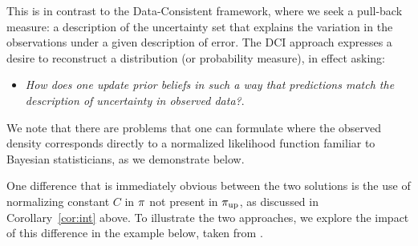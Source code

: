 This is in contrast to the Data-Consistent framework, where we seek a pull-back measure: a description of the uncertainty set that explains the variation in the observations under a given description of error.
The DCI approach expresses a desire to reconstruct a distribution (or probability measure), in effect asking:
\begin{itemize} 
  \item \emph{How does one update prior beliefs in such a way that predictions match the description of uncertainty in observed data?}.
\end{itemize}

We note that there are problems that one can formulate where the observed density corresponds directly to a normalized likelihood function familiar to Bayesian statisticians, as we demonstrate below. 

One difference that is immediately obvious between the two solutions is the use of normalizing constant $C$ in $\pi$ not present in $\operatorname*{\pi_{up}}$, as discussed in Corollary~\ref{cor:int} above.
To illustrate the two approaches, we explore the impact of this difference in the example below, taken from \cite{BJW18}.

